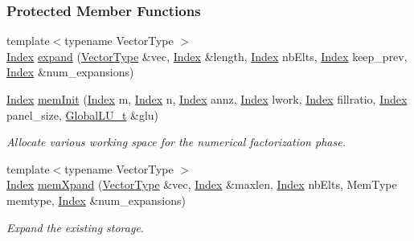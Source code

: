 \subsubsection*{Protected Member Functions}
\begin{DoxyCompactItemize}
\item 
{\footnotesize template$<$typename Vector\+Type $>$ }\\\hyperlink{namespace_eigen_a62e77e0933482dafde8fe197d9a2cfde}{Index} \hyperlink{group___sparse_l_u___module_acc7811f7de19ffb804cb4b1fd5288f3e}{expand} (\hyperlink{struct_vector_type}{Vector\+Type} \&vec, \hyperlink{namespace_eigen_a62e77e0933482dafde8fe197d9a2cfde}{Index} \&length, \hyperlink{namespace_eigen_a62e77e0933482dafde8fe197d9a2cfde}{Index} nb\+Elts, \hyperlink{namespace_eigen_a62e77e0933482dafde8fe197d9a2cfde}{Index} keep\+\_\+prev, \hyperlink{namespace_eigen_a62e77e0933482dafde8fe197d9a2cfde}{Index} \&num\+\_\+expansions)
\item 
\hyperlink{namespace_eigen_a62e77e0933482dafde8fe197d9a2cfde}{Index} \hyperlink{group___sparse_l_u___module_ac018b8ed9664d4e19e34f1ff2d6c578a}{mem\+Init} (\hyperlink{namespace_eigen_a62e77e0933482dafde8fe197d9a2cfde}{Index} m, \hyperlink{namespace_eigen_a62e77e0933482dafde8fe197d9a2cfde}{Index} n, \hyperlink{namespace_eigen_a62e77e0933482dafde8fe197d9a2cfde}{Index} annz, \hyperlink{namespace_eigen_a62e77e0933482dafde8fe197d9a2cfde}{Index} lwork, \hyperlink{namespace_eigen_a62e77e0933482dafde8fe197d9a2cfde}{Index} fillratio, \hyperlink{namespace_eigen_a62e77e0933482dafde8fe197d9a2cfde}{Index} panel\+\_\+size, \hyperlink{struct_eigen_1_1internal_1_1_l_u___global_l_u__t}{Global\+L\+U\+\_\+t} \&glu)
\begin{DoxyCompactList}\small\item\em Allocate various working space for the numerical factorization phase. \end{DoxyCompactList}\item 
{\footnotesize template$<$typename Vector\+Type $>$ }\\\hyperlink{namespace_eigen_a62e77e0933482dafde8fe197d9a2cfde}{Index} \hyperlink{group___sparse_l_u___module_a2a6465f1173fd8b74b2e5b8ceec53343}{mem\+Xpand} (\hyperlink{struct_vector_type}{Vector\+Type} \&vec, \hyperlink{namespace_eigen_a62e77e0933482dafde8fe197d9a2cfde}{Index} \&maxlen, \hyperlink{namespace_eigen_a62e77e0933482dafde8fe197d9a2cfde}{Index} nb\+Elts, Mem\+Type memtype, \hyperlink{namespace_eigen_a62e77e0933482dafde8fe197d9a2cfde}{Index} \&num\+\_\+expansions)
\begin{DoxyCompactList}\small\item\em Expand the existing storage. \end{DoxyCompactList}\item 

\end{DoxyCompactItemize}
